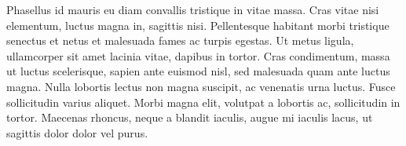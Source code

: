 Phasellus id mauris eu diam convallis tristique in vitae massa. Cras vitae nisi elementum, luctus magna in, sagittis nisi. Pellentesque habitant morbi tristique senectus et netus et malesuada fames ac turpis egestas. Ut metus ligula, ullamcorper sit amet lacinia vitae, dapibus in tortor. Cras condimentum, massa ut luctus scelerisque, sapien ante euismod nisl, sed malesuada quam ante luctus magna. Nulla lobortis lectus non magna suscipit, ac venenatis urna luctus. Fusce sollicitudin varius aliquet. Morbi magna elit, volutpat a lobortis ac, sollicitudin in tortor. Maecenas rhoncus, neque a blandit iaculis, augue mi iaculis lacus, ut sagittis dolor dolor vel purus.


